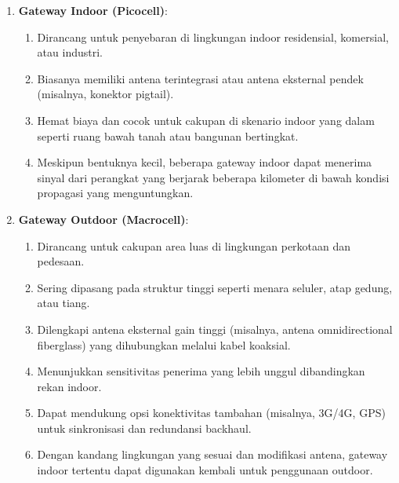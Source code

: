 \begin{enumerate}
    \item \textbf{Gateway Indoor (Picocell)}:
          \begin{enumerate}
              \item Dirancang untuk penyebaran di lingkungan indoor residensial, komersial, atau industri.
              \item Biasanya memiliki antena terintegrasi atau antena eksternal pendek (misalnya, konektor pigtail).
              \item Hemat biaya dan cocok untuk cakupan di skenario indoor yang dalam seperti ruang bawah tanah atau bangunan bertingkat.
              \item Meskipun bentuknya kecil, beberapa gateway indoor dapat menerima sinyal dari perangkat yang berjarak beberapa kilometer di bawah kondisi propagasi yang menguntungkan.
          \end{enumerate}
    \item \textbf{Gateway Outdoor (Macrocell)}:
          \begin{enumerate}
              \item Dirancang untuk cakupan area luas di lingkungan perkotaan dan pedesaan.
              \item Sering dipasang pada struktur tinggi seperti menara seluler, atap gedung, atau tiang.
              \item Dilengkapi antena eksternal gain tinggi (misalnya, antena omnidirectional fiberglass) yang dihubungkan melalui kabel koaksial.
              \item Menunjukkan sensitivitas penerima yang lebih unggul dibandingkan rekan indoor.
              \item Dapat mendukung opsi konektivitas tambahan (misalnya, 3G/4G, GPS) untuk sinkronisasi dan redundansi backhaul.
              \item Dengan kandang lingkungan yang sesuai dan modifikasi antena, gateway indoor tertentu dapat digunakan kembali untuk penggunaan outdoor.
          \end{enumerate}
\end{enumerate}
